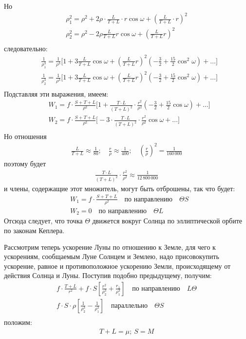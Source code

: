 \documentclass[a4paper,12pt]{article}
\begin{document}
Но
\[
\begin{aligned}
\rho_1^2=\rho^2+2\rho\cdot\frac L{T+L} \cdot r\cos\omega+\left(\frac L{T+L}\cdot r\right)^2 \\
\rho_2^2=\rho^2-2\rho\frac L{T+L} r\cos\omega+\left(\frac L{T+L} r\right)^2 \\
\end{aligned}
\]
следовательно:
\[
\begin{aligned}
& \frac 1{\rho_1^3}=\frac1{\rho^3}\biggl[1+3\frac L{T+L}\cos\omega+\left(\frac L{T+L}r \right)^2\left(-\frac 32 + \frac {15}{2}\cos^2\omega\right)+\ldots\biggr] \\
& \frac 1{\rho_2^3}=\frac1{\rho^3}\biggl[1+3\frac L{T+L}\cos\omega+\left(\frac L{T+L}r \right)^2\left(-\frac 32 + \frac {15}{2}\cos^2\omega\right)+\ldots\biggr] \\
\end{aligned}
\]
Подставляя эти выражения, имеем:
\[
\begin{aligned}
& W_1=f\cdot\frac {S+T+L}{\rho^2}\biggl[1+\frac {T\cdot L}{(T+L)^2}\cdot \frac{r^2}{\rho^2}\left(-\frac32+\frac{15}{2}\cos\omega\right)+\ldots\biggr] \\
& W_2=f\cdot\frac {S+T+L}{\rho^2}\biggl[-3\cdot\frac {T\cdot L}{(T+L)^2}\cdot \frac{r^2}{\rho^2}\cos\omega+\ldots\biggr] \\
\end{aligned}
\]
Но отношения
\[
\begin{aligned}
\frac L{T+L}\approx \frac 1{80}; \quad \frac r\rho \approx \frac{1}{400}; \quad \left(\frac r\rho \right)^2=\frac{1}{160\,000}
\end{aligned}
\]
поэтому будет
\[
\begin{aligned}
\frac {T\cdot L}{(T+L)^2}\cdot \frac{r^2}{\rho^2}\approx\frac{1}{12\,800\,000}
\end{aligned}
\]
и члены, содержащие этот множитель, могут быть отброшены, так что будет:
\[
\begin{aligned}
&W_1= f\cdot \frac {S+T+L}{\rho^2} \quad \text {по направлению} \quad \Theta S \\
&W_2= 0 \quad  \text{по направлению} \quad \Theta L
\end{aligned}
\]
Отсюда следует, что точка $\Theta$ движется вокруг Солнца по эллиптической орбите по законам Кеплера. 

Рассмотрим теперь ускорение Луны по отношению к Земле, для чего к ускорениям, сообщаемым Луне Солнцем и Землею, надо присовокупить
ускорение, равное и противоположное ускорению Земли, происходящему от действия Солнца и Луны. Поступив подобно предыдущему, получим:
\[
\begin{aligned}
f\cdot \frac{T+L}{r^2}+f \cdot S \left[\frac{r^2}{\rho_2^3}+\frac{r_1}{\rho_1^3}\right] \quad  \text{по направлению} \quad L\Theta \\
f\cdot S \cdot \rho \left[\frac{1}{\rho_2^3}-\frac{1}{\rho_1^3}\right] \quad  \text{параллельно} \quad \Theta S \\
\end{aligned}
\]
положим:
\[
\begin{aligned}
T+L=\mu; \ S=M
\end{aligned}
\]
\listoffigures 
\listoftables
\end{document}
